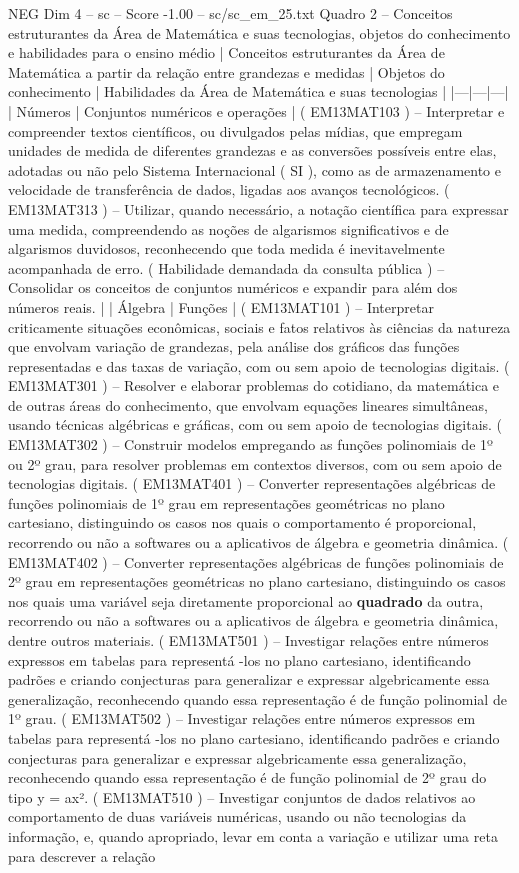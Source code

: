\begin{textsample}{NEG Dim 4 – sc – Score -1.00 – sc/sc\_em\_25.txt}
Quadro 2 – Conceitos estruturantes da Área de Matemática e suas tecnologias, objetos do conhecimento e habilidades para o ensino médio | Conceitos estruturantes da Área de Matemática a partir da relação entre grandezas e medidas | Objetos do conhecimento | Habilidades da Área de Matemática e suas tecnologias | |---|---|---| | Números | Conjuntos numéricos e operações | ( EM13MAT103 ) – Interpretar e compreender textos científicos, ou divulgados pelas mídias, que empregam unidades de medida de diferentes grandezas e as conversões possíveis entre elas, adotadas ou não pelo Sistema Internacional ( SI ), como as de armazenamento e velocidade de transferência de dados, ligadas aos avanços tecnológicos. ( EM13MAT313 ) – Utilizar, quando necessário, a notação científica para expressar uma medida, compreendendo as noções de algarismos significativos e de algarismos duvidosos, reconhecendo que toda medida é inevitavelmente acompanhada de erro. ( Habilidade demandada da consulta pública ) – Consolidar os conceitos de conjuntos numéricos e expandir para além dos números reais. | | Álgebra | Funções | ( EM13MAT101 ) – Interpretar criticamente situações econômicas, sociais e fatos relativos às ciências da natureza que envolvam variação de grandezas, pela análise dos gráficos das funções representadas e das taxas de variação, com ou sem apoio de tecnologias digitais. ( EM13MAT301 ) – Resolver e elaborar problemas do cotidiano, da matemática e de outras áreas do conhecimento, que envolvam equações lineares simultâneas, usando técnicas algébricas e gráficas, com ou sem apoio de tecnologias digitais. ( EM13MAT302 ) – Construir modelos empregando as funções polinomiais de 1º ou 2º grau, para resolver problemas em contextos diversos, com ou sem apoio de tecnologias digitais. ( EM13MAT401 ) – Converter representações algébricas de funções polinomiais de 1º grau em representações geométricas no plano cartesiano, distinguindo os casos nos quais o comportamento é proporcional, recorrendo ou não a softwares ou a aplicativos de álgebra e geometria dinâmica. ( EM13MAT402 ) – Converter representações algébricas de funções polinomiais de 2º grau em representações geométricas no plano cartesiano, distinguindo os casos nos quais uma variável seja diretamente proporcional ao \textbf{quadrado} da outra, recorrendo ou não a softwares ou a aplicativos de álgebra e geometria dinâmica, dentre outros materiais. ( EM13MAT501 ) – Investigar relações entre números expressos em tabelas para representá -los no plano cartesiano, identificando padrões e criando conjecturas para generalizar e expressar algebricamente essa generalização, reconhecendo quando essa representação é de função polinomial de 1º grau. ( EM13MAT502 ) – Investigar relações entre números expressos em tabelas para representá -los no plano cartesiano, identificando padrões e criando conjecturas para generalizar e expressar algebricamente essa generalização, reconhecendo quando essa representação é de função polinomial de 2º grau do tipo y = ax². ( EM13MAT510 ) – Investigar conjuntos de dados relativos ao comportamento de duas variáveis numéricas, usando ou não tecnologias da informação, e, quando apropriado, levar em conta a variação e utilizar uma reta para descrever a relação 
\end{textsample}
